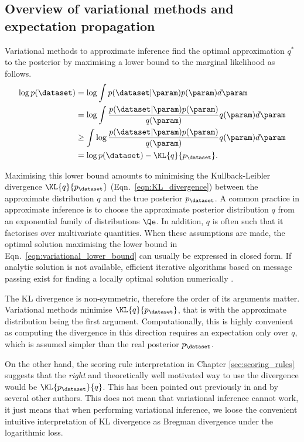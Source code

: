 \subsection{Overview of variational methods and expectation propagation}

Variational methods to approximate inference find the optimal approximation $q^{*}$ to the posterior by maximising a lower bound to the marginal likelihood as follows.
%
\begin{align}
	\log p(\dataset) &= \log \int p(\dataset\vert\param)p(\param) d\param\\
		&=\log \int \frac{p(\dataset\vert\param)p(\param)}{q(\param)}q(\param) d\param\\
		&\geq \int \log \frac{p(\dataset\vert\param)p(\param)}{q(\param)} q(\param) d\param\\
		&= \log p(\dataset) - \KL{q}{p_{\dataset}}.      \label{eqn:variational_lower_bound}
\end{align}

Maximising this lower bound amounts to minimising the Kullback-Leibler divergence $\KL{q}{p_{\dataset}}$ (Eqn.\ \eqref{eqn:KL_divergence}) between the approximate distribution $q$ and the true posterior $p_{\dataset}$. A common practice in approximate inference is to choose the approximate posterior distribution $q$ from an exponential family of distributions $\Qe$. In addition, $q$ is often such that it factorises over multivariate quantities. When these assumptions are made, the optimal solution maximising the lower bound in Eqn.\ \eqref{eqn:variational_lower_bound} can usually be expressed in closed form. If analytic solution is not available, efficient iterative algorithms based on message passing exist for finding a locally optimal solution numerically \citep{Winn2006}.

The KL divergence is non-symmetric, therefore the order of its arguments matter. Variational methods minimise $\KL{q}{p_{\dataset}}$, that is with the approximate distribution being the first argument. Computationally, this is highly convenient as computing the divergence in this direction requires an expectation only over $q$, which is assumed simpler than the real posterior $p_{\dataset}$.

On the other hand, the scoring rule interpretation in Chapter \ref{sec:scoring_rules} suggests that the \emph{right} and theoretically well motivated way to use the divergence would be $\KL{p_{\dataset}}{q}$. This has been pointed out previously in \citep{Csato2002,Minka2001} and by several other authors. This does not mean that variational inference cannot work, it just means that when performing variational inference, we loose the convenient intuitive interpretation of KL divergence as Bregman divergence under the logarithmic loss.

